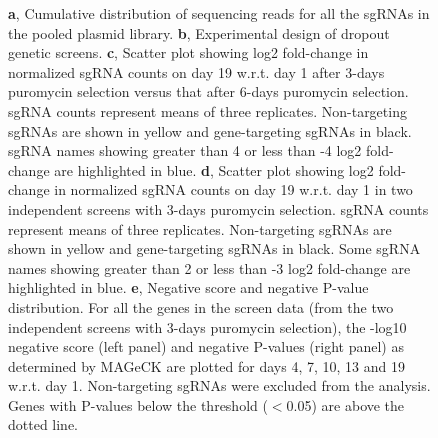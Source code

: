 \addtocounter{figure}{-1}
\begin{figure}
  \caption{
            \newline
            \textbf{a}, Cumulative distribution of sequencing reads for all the sgRNAs in the pooled plasmid library.
            \newline
            \textbf{b}, Experimental design of dropout genetic screens.
            \newline
            \textbf{c}, Scatter plot showing log2 fold-change in normalized sgRNA counts on day 19 w.r.t. day 1 after 3-days puromycin selection versus that after 6-days puromycin selection. sgRNA counts represent means of three replicates. Non-targeting sgRNAs are shown in yellow and gene-targeting sgRNAs in black. sgRNA names showing greater than 4 or less than -4 log2 fold-change are highlighted in blue.
            \newline
            \textbf{d}, Scatter plot showing log2 fold-change in normalized sgRNA counts on day 19 w.r.t. day 1 in two independent screens with 3-days puromycin selection. sgRNA counts represent means of three replicates. Non-targeting sgRNAs are shown in yellow and gene-targeting sgRNAs in black. Some sgRNA names showing greater than 2 or less than -3 log2 fold-change are highlighted in blue.
            \newline
            \textbf{e}, Negative score and negative P-value distribution. For all the genes in the screen data (from the two independent screens with 3-days puromycin selection), the -log10 negative score (left panel) and negative P-values (right panel) as determined by MAGeCK are plotted for days 4, 7, 10, 13 and 19 w.r.t. day 1. Non-targeting sgRNAs were excluded from the analysis. Genes with P-values below the threshold ($<$0.05) are above the dotted line. 
        }
\end{figure}

\clearpage

